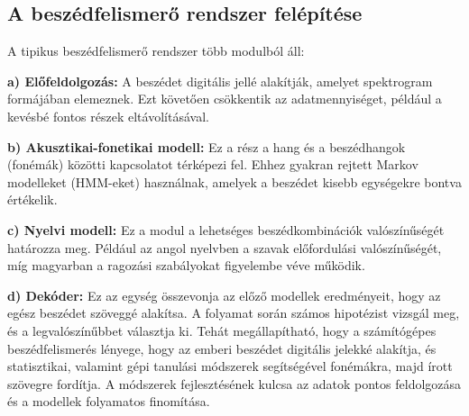 \documentclass[12pt]{report}
\begin{document}
\subsection{A beszédfelismerő rendszer felépítése}
A tipikus beszédfelismerő rendszer több modulból áll:
\newline
\raggedright\textbf{a) Előfeldolgozás:}\linebreak
A beszédet digitális jellé alakítják, amelyet spektrogram formájában elemeznek. Ezt követően csökkentik az adatmennyiséget, például a kevésbé fontos részek eltávolításával.
\newline
\raggedright\textbf{b) Akusztikai-fonetikai modell:}\linebreak
Ez a rész a hang és a beszédhangok (fonémák) közötti kapcsolatot térképezi fel. Ehhez gyakran rejtett Markov modelleket (HMM-eket) használnak, amelyek a beszédet kisebb egységekre bontva értékelik.
\newline
\raggedright\textbf{c) Nyelvi modell:}\linebreak
Ez a modul a lehetséges beszédkombinációk valószínűségét határozza meg. Például az angol nyelvben a szavak előfordulási valószínűségét, míg magyarban a ragozási szabályokat figyelembe véve működik.
\newline
\raggedright\textbf{d) Dekóder:}\linebreak
Ez az egység összevonja az előző modellek eredményeit, hogy az egész beszédet szöveggé alakítsa. A folyamat során számos hipotézist vizsgál meg, és a legvalószínűbbet választja ki.
\linebreak
Tehát megállapítható, hogy a számítógépes beszédfelismerés lényege, hogy az emberi beszédet digitális jelekké alakítja, és statisztikai, valamint gépi tanulási módszerek segítségével fonémákra, majd írott szövegre fordítja. A módszerek fejlesztésének kulcsa az adatok pontos feldolgozása és a modellek folyamatos finomítása.
\pagebreak
\end{document}
